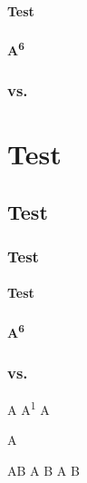 \documentclass[series=CorpusAvesticum,gitver=true,PhD=false,tocdepth=subfivesection]{brill}
\begin{document}
\subsection{Test}
\subsection{A\textsuperscript{6}}
\section{\Av{\XVE} vs. }
\part{Test}
\chapter{Test}

\section{Test}

\subsection{Test}
\subsection{A\textsuperscript{6}}
\section{\Av{\XVE} vs. }

A\textsuperscript{\thechapter} A\textsuperscript{1} A

A

A\supth B A B A B
\end{document}
